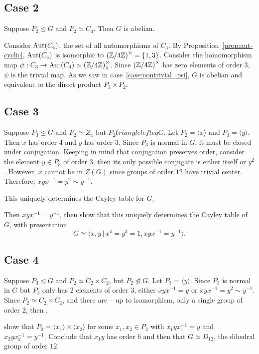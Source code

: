\subsection*{Case 2} Suppose $P_2 \trianglelefteq G$ and $P_2 \simeq C_4$.
Then $G$ is abelian.

Consider $\operatorname{Aut}(C_4)$, the set of all automorphisms of $C_4$.
By Proposition~\ref{prop:aut-cyclic}, $\operatorname{Aut}(C_4)$ is isomorphic to
${(\mathbb{Z}/4\mathbb{Z})}^\times = \{ 1, 3 \}$.
Consider the homomorphism map $\psi : C_3 \to \operatorname{Aut}(C_4) \simeq {(\mathbb{Z}/4\mathbb{Z})}_4^\times$.
Since ${(\mathbb{Z}/4\mathbb{Z})}^\times$ has zero elements of order $3$,
$\psi$ is the trivial map. As we saw in case~\ref{case:nontrivial_psi},
$G$ is abelian and equivalent to the direct product $P_3 \times P_2$.

\subsection*{Case 3} Suppose $P_3 \trianglelefteq G$ and $P_2 \simeq Z_4$
but $P_2 \not trianglelefteq G$.
Let $P_2=\langle x \rangle$ and $P_3=\langle y \rangle$.
Then $x$ has order $4$ and $y$ has order $3$.
Since $P_3$ is normal in $G$, it must be closed under conjugation.
Keeping in mind that conjugation preserves order,
consider the element $y \in P_3$ of order $3$,
then its only possible conjugate is either itself or $y^2$.
However, $x$ cannot be in $Z(G)$ since groups of order $12$
have trivial center. Therefore, $xyx^{-1} = y^2 \sim y^{-1}$.

This uniquely determines the Cayley table for $G$.


Then $xyx^{-1}=y^{-1}$, then show that this uniquely determines the Cayley 
table of $G$, with presentation
\[ G \simeq \langle x,y \,|\, x^4=y^3=1, xyx^{-1}=y^{-1} \rangle. \]

\subsection*{Case 4} Suppose $P_3 \trianglelefteq G$ and 
$P_2 \simeq C_2 \times C_2$, but $P_2 \not\trianglelefteq G$.
Let $P_3 = \langle y \rangle$. Since $P_3$ is normal in $G$
but $P_3$ only has $2$ elements of order $3$, either
$xyx^{-1} = y$ or $xyx^{-1} = y^2 \sim y^{-1}$.
Since $P_2 \simeq C_2 \times C_2$, and there are -- up to isomorphism,
only a single group of order $2$, then , 

show that $P_2 = 
\langle x_1 \rangle \times \langle x_2 \rangle$ for some $x_1,x_2 \in P_2$ with 
$x_1yx_1^{-1}=y$ and $x_2yx_2^{-1}=y^{-1}$.  Conclude that $x_1y$ has order $6$ and
then that $G \simeq D_{12}$, the dihedral group of order $12$.  
